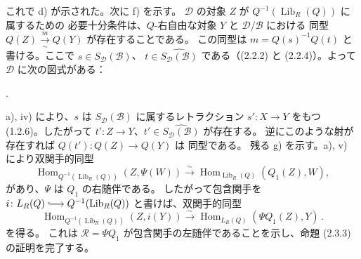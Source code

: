 \clearpage
{}%
\begingroup
\small
\setlength{\parskip}{0pt}%
\setlength{\emergencystretch}{1.5em}%
\setlength{\abovedisplayskip}{3pt plus 1pt minus 1pt}%
\setlength{\belowdisplayskip}{3pt plus 1pt minus 1pt}%

\noindent これで d) が示された。次に f) を示す。
$\mathcal D$ の対象 $Z$ が $Q^{-1}(\operatorname{Lib}_R(Q))$ に属するための
必要十分条件は、$Q$-右自由な対象 $Y$ と $\mathcal D/\mathcal B$ における
同型 $Q(Z)\xrightarrow[\sim]{m}Q(Y)$ が存在することである。
この同型は $m=Q(s)^{-1}Q(t)$ と書ける。ここで
$s\in S_{\mathcal D}(\mathcal B)$、
$t\in\widehat{S_{\mathcal D}(\mathcal B)}$ である（(2.2.2) と
(2.2.4)）。よって $\mathcal D$ に次の図式がある：
\begin{center}
 \quad .
\end{center}
a), iv) により、$s$ は $S_{\mathcal D}(\mathcal B)$ に属するレトラクション
$s'\colon X\longrightarrow Y$ をもつ (1.2.6)。したがって
$t'\colon Z\longrightarrow Y$、$t'\in\widehat{S_{\mathcal D}(\mathcal B)}$
が存在する。
逆にこのような射が存在すれば $Q(t')\colon Q(Z)\longrightarrow Q(Y)$ は
同型である。
残る g) を示す。a), v) により双関手的同型
\[
 \operatorname{Hom}_{Q^{-1}(\operatorname{Lib}_R(Q))}(Z,\Psi(W))
 \xrightarrow{\sim}
 \operatorname{Hom}_{\operatorname{Lib}_R(Q)}(Q_1(Z),W),
\]
があり、$\Psi$ は $Q_1$ の右随伴である。
したがって包含関手を $i\colon L_R(Q)\lhook\joinrel\longrightarrow
Q^{-1}(\operatorname{Lib}_R(Q))$ と書けば、双関手的同型
\[
 \operatorname{Hom}_{Q^{-1}(\operatorname{Lib}_R(Q))}(Z,i(Y))
 \xrightarrow{\sim}
 \operatorname{Hom}_{L_R(Q)}(\Psi Q_1(Z),Y)\, .
\]
を得る。
これは $\mathcal R=\Psi Q_1$ が包含関手の左随伴であることを示し、命題
(2.3.3) の証明を完了する。


